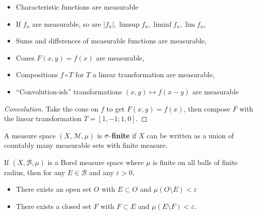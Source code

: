 \begin{proposition}

\begin{itemize}
\tightlist
\item
  Characteristic functions are measurable
\item
  If \(f_{n}\) are measurable, so are
  \({\left\lvert {f_{n}} \right\rvert}, \limsup f_{n}, \liminf f_{n}, \lim f_{n}\),
\item
  Sums and differences of measurable functions are measurable,
\item
  Cones \(F(x,y) = f(x)\) are measurable,
\item
  Compositions \(f\circ T\) for \(T\) a linear transformation are
  measurable,
\item
  ``Convolution-ish'' transformations \((x,y) \mapsto f(x-y)\) are
  measurable
\end{itemize}

\end{proposition}

\begin{proof}[Convolution]

Take the cone on \(f\) to get \(F(x, y) = f(x)\), then compose \(F\)
with the linear transformation \(T = [1, -1; 1, 0]\).

\end{proof}

\begin{definition}

A measure space \((X, {\mathcal{M}}, \mu)\) is
\textbf{\(\sigma{\hbox{-}}\)finite} if \(X\) can be written as a union
of countably many measurable sets with finite measure.

\end{definition}

\begin{proposition}

If \((X, {\mathcal{B}}, \mu)\) is a Borel measure space where \(\mu\) is
finite on all balls of finite radius, then for any
\(E \in {\mathcal{B}}\) and any \({\varepsilon}>0\),

\begin{itemize}
\tightlist
\item
  There exists an open set \(O\) with \(E \subset O\) and
  \(\mu(O\setminus E) < {\varepsilon}\)
\item
  There exists a closed set \(F\) with \(F\subset E\) and
  \(\mu(E\setminus F) < {\varepsilon}\).
\end{itemize}

\end{proposition}

